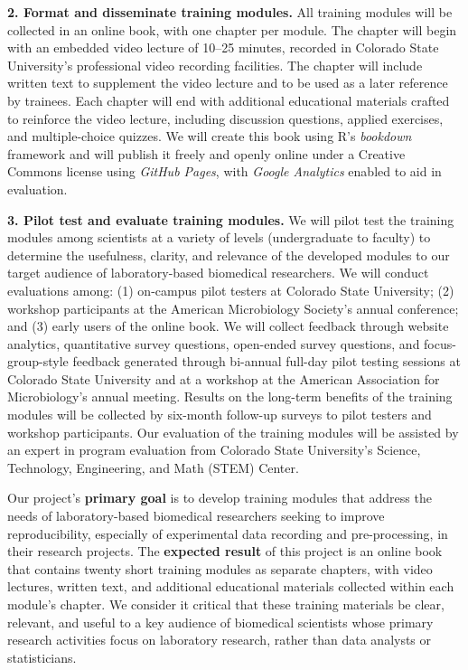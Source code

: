 \documentclass[pdftex,english,11.5pt,parskip=half]{scrartcl}
\begin{document}
\textbf{2. Format and disseminate training modules.} All training modules will be collected in an online book, with one chapter per module. The chapter will begin with an embedded video lecture of 10--25 minutes, recorded in Colorado State University's professional video recording facilities. The chapter will include written text to supplement the video lecture and to be used as a later reference by trainees. Each chapter will end with additional educational materials crafted to reinforce the video lecture, including discussion questions, applied exercises, and multiple-choice quizzes. We will create this book using R's \textit{bookdown} framework and will publish it freely and openly online under a Creative Commons license using \textit{GitHub Pages}, with \textit{Google Analytics} enabled to aid in evaluation. 

\textbf{3. Pilot test and evaluate training modules.} We will pilot test the training modules among scientists at a variety of levels (undergraduate to faculty) to determine the usefulness, clarity, and relevance of the developed modules to our target audience of laboratory-based biomedical researchers. We will conduct evaluations among: (1) on-campus pilot testers at Colorado State University; (2) workshop participants at the American Microbiology Society's annual conference; and (3) early users of the online book. We will collect feedback through website analytics, quantitative survey questions, open-ended survey questions, and focus-group-style feedback generated through bi-annual full-day pilot testing sessions at Colorado State University and at a workshop at the American Association for Microbiology's annual meeting. Results on the long-term benefits of the training modules will be collected by six-month follow-up surveys to pilot testers and workshop participants. Our evaluation of the training modules will be assisted by an expert in program evaluation from Colorado State University's Science, Technology, Engineering, and Math (STEM) Center. 

Our project's \textbf{primary goal} is to develop
training modules that address the needs of laboratory-based biomedical
researchers seeking to improve reproducibility, especially of experimental data
recording and pre-processing, in their research projects. The \textbf{expected result} of
this project is an online book that contains twenty short training modules as separate
chapters, with video lectures, written text, and additional educational
materials collected within each module's chapter. We consider it critical that
these training materials be clear, relevant, and useful to a key audience of
biomedical scientists whose primary research activities focus on laboratory
research, rather than data analysts or statisticians. 
\end{document}
